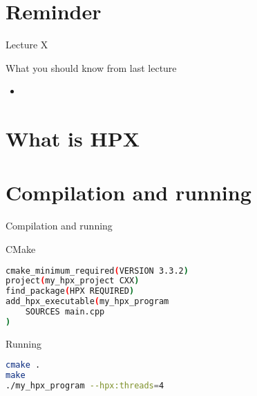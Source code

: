 \documentclass[12pt,t]{beamer}
\title{\coursename}
\subtitle{Lecture 11: Introduction to HPX}
\date {
 \tiny \url{\courseurl}
\vspace{2cm}
\doclicenseThis  
  
}
\begin{document}
 {
    \frame {
        \titlepage
    }
}

\frame{

\tableofcontents

}


\section{Reminder}
\begin{frame}{Lecture X}
\begin{block}{What you should know from last lecture}
\begin{itemize}
\item 
\end{itemize}
\end{block}
\end{frame}


\section{What is HPX}


\section{Compilation and running}

\begin{frame}[fragile]{Compilation and running}

\begin{block}{CMake}
\begin{lstlisting}[language=bash]
cmake_minimum_required(VERSION 3.3.2)
project(my_hpx_project CXX)
find_package(HPX REQUIRED)
add_hpx_executable(my_hpx_program
    SOURCES main.cpp
)
\end{lstlisting}
\end{block}

\begin{block}{Running}
\begin{lstlisting}[language=bash]
cmake .
make
./my_hpx_program --hpx:threads=4
\end{lstlisting}
\end{block}
\end{frame}
\end{document}
